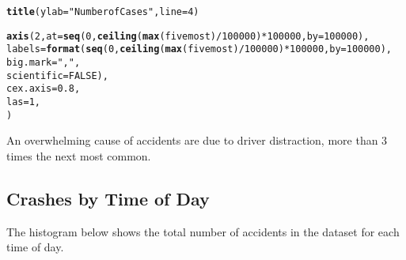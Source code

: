 \documentclass[10pt]{article}\usepackage[]{graphicx}\usepackage[]{xcolor}
\makeatletter
\newcommand{\hlnum}[1]{\textcolor[rgb]{0.686,0.059,0.569}{#1}}%
\newcommand{\hlsng}[1]{\textcolor[rgb]{0.192,0.494,0.8}{#1}}%
\newcommand{\hlopt}[1]{\textcolor[rgb]{0,0,0}{#1}}%
\newcommand{\hldef}[1]{\textcolor[rgb]{0.345,0.345,0.345}{#1}}%
\newcommand{\hlkwc}[1]{\textcolor[rgb]{0.333,0.667,0.333}{#1}}%
\newcommand{\hlkwd}[1]{\textcolor[rgb]{0.737,0.353,0.396}{\textbf{#1}}}%
\newenvironment{kframe}{%
 \def\at@end@of@kframe{}%
 \ifinner\ifhmode%
  \def\at@end@of@kframe{\end{minipage}}%
  \begin{minipage}{\columnwidth}%
 \fi\fi%
 \def\FrameCommand##1{\hskip\@totalleftmargin \hskip-\fboxsep
 \colorbox{shadecolor}{##1}\hskip-\fboxsep
     \hskip-\linewidth \hskip-\@totalleftmargin \hskip\columnwidth}%
 \MakeFramed {\advance\hsize-\width
   \@totalleftmargin\z@ \linewidth\hsize
   \@setminipage}}%
 {\par\unskip\endMakeFramed%
 \at@end@of@kframe}
\newenvironment{knitrout}{}{} %
\makeatother
\begin{document}
\begin{knitrout}
\begin{kframe}
{\ttfamily\noindent\bfseries{}}\begin{alltt}
\hlkwd{title}\hldef{(}\hlkwc{ylab} \hldef{=} \hlsng{"Number of Cases"}\hldef{,} \hlkwc{line}\hldef{=}\hlnum{4}\hldef{)}
\end{alltt}


{\ttfamily\noindent\bfseries{}}\begin{alltt}
\hlkwd{axis}\hldef{(}\hlnum{2}\hldef{,} \hlkwc{at} \hldef{=} \hlkwd{seq}\hldef{(}\hlnum{0}\hldef{,} \hlkwd{ceiling}\hldef{(}\hlkwd{max}\hldef{(fivemost)}\hlopt{/}\hlnum{100000}\hldef{)}\hlopt{*}\hlnum{100000}\hldef{,} \hlkwc{by} \hldef{=} \hlnum{100000}\hldef{),}
     \hlkwc{labels} \hldef{=} \hlkwd{format}\hldef{(}\hlkwd{seq}\hldef{(}\hlnum{0}\hldef{,} \hlkwd{ceiling}\hldef{(}\hlkwd{max}\hldef{(fivemost)}\hlopt{/}\hlnum{100000}\hldef{)}\hlopt{*}\hlnum{100000}\hldef{,} \hlkwc{by} \hldef{=} \hlnum{100000}\hldef{),}
                     \hlkwc{big.mark} \hldef{=} \hlsng{","}\hldef{,}
                     \hlkwc{scientific} \hldef{=} \hlnum{FALSE}\hldef{),}
     \hlkwc{cex.axis} \hldef{=} \hlnum{0.8}\hldef{,}
     \hlkwc{las} \hldef{=} \hlnum{1}\hldef{,}
     \hldef{)}
\end{alltt}


{\ttfamily\noindent\color{warningcolor}{\#\# Warning in max(fivemost): no non-missing arguments to max; returning -Inf}}

{\ttfamily\noindent\bfseries\color{errorcolor}{\#\# Error in seq.default(0, ceiling(max(fivemost)/1e+05) * 1e+05, by = 1e+05): 'to' must be a finite number}}\end{kframe}
\end{knitrout}
An overwhelming cause of accidents are due to driver distraction, more than 3 times the next most common.


\subsection{Crashes by Time of Day}

The histogram below shows the total number of accidents in the dataset for each time of day. 
\end{document}
